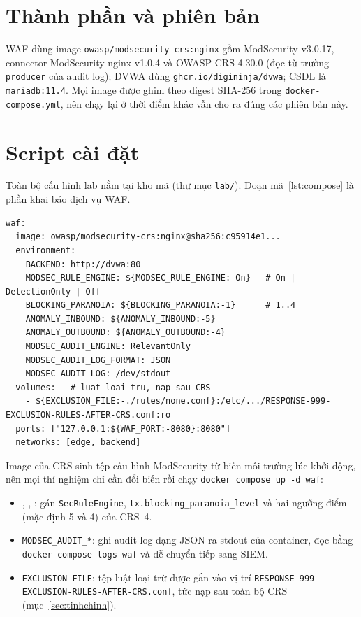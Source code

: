 \section{Thành phần và phiên bản}
WAF dùng image \texttt{owasp/modsecurity-crs:nginx} gồm ModSecurity v3.0.17, connector ModSecurity-nginx v1.0.4 và OWASP CRS 4.30.0 (đọc từ trường \texttt{producer} của audit log); DVWA dùng \texttt{ghcr.io/digininja/dvwa}; CSDL là \texttt{mariadb:11.4}. Mọi image được ghim theo digest SHA-256 trong \texttt{docker-compose.yml}, nên chạy lại ở thời điểm khác vẫn cho ra đúng các phiên bản này.

\section{Script cài đặt}
Toàn bộ cấu hình lab nằm tại kho mã \repourl{} (thư mục \texttt{lab/}). Đoạn mã~\ref{lst:compose} là phần khai báo dịch vụ WAF.

\begin{lstlisting}[caption={Trích đoạn \texttt{lab/docker-compose.yml} (dịch vụ WAF)},label={lst:compose}]
waf:
  image: owasp/modsecurity-crs:nginx@sha256:c95914e1...
  environment:
    BACKEND: http://dvwa:80
    MODSEC_RULE_ENGINE: ${MODSEC_RULE_ENGINE:-On}   # On | DetectionOnly | Off
    BLOCKING_PARANOIA: ${BLOCKING_PARANOIA:-1}      # 1..4
    ANOMALY_INBOUND: ${ANOMALY_INBOUND:-5}
    ANOMALY_OUTBOUND: ${ANOMALY_OUTBOUND:-4}
    MODSEC_AUDIT_ENGINE: RelevantOnly
    MODSEC_AUDIT_LOG_FORMAT: JSON
    MODSEC_AUDIT_LOG: /dev/stdout
  volumes:   # luat loai tru, nap sau CRS
    - ${EXCLUSION_FILE:-./rules/none.conf}:/etc/.../RESPONSE-999-EXCLUSION-RULES-AFTER-CRS.conf:ro
  ports: ["127.0.0.1:${WAF_PORT:-8080}:8080"]
  networks: [edge, backend]
\end{lstlisting}

Image của CRS sinh tệp cấu hình ModSecurity từ biến môi trường lúc khởi động, nên mọi thí nghiệm chỉ cần đổi biến rồi chạy \texttt{docker compose up -d waf}:
\begin{itemize}
  \item {}, , : gán \texttt{SecRuleEngine}, \texttt{tx.blocking\_paranoia\_level} và hai ngưỡng điểm (mặc định 5 và 4) của CRS~4.
  \item \texttt{MODSEC\_AUDIT\_*}: ghi audit log dạng JSON ra stdout của container, đọc bằng \texttt{docker compose logs waf} và dễ chuyển tiếp sang SIEM.
  \item \texttt{EXCLUSION\_FILE}: tệp luật loại trừ được gắn vào vị trí \texttt{RESPONSE-999-EXCLUSION-RULES-AFTER-CRS.conf}, tức nạp sau toàn bộ CRS (mục~\ref{sec:tinhchinh}).
\end{itemize}

